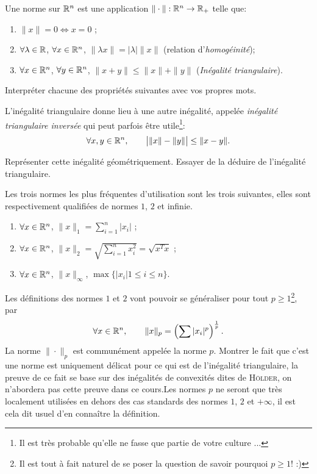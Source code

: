 \documentclass[11pt, a4paper]{article}
\begin{document}
\begin{defn}
  Une norme sur $\mathbb{R}^n$ est une application $\|\cdot\| : \mathbb{R}^n \to \mathbb{R}_+$
  telle que:
  \begin{enumerate}
  \item $\|x\| = 0 \Leftrightarrow x = 0$ ;
  \item $\forall \lambda \in \mathbb{R}$, $\forall x \in \mathbb{R}^n$,
    $\|\lambda x\| = |\lambda|\|x\|$ (relation d'\textit{homogéinité});
  \item $\forall x \in \mathbb{R}^n$, $\forall y \in \mathbb{R}^n$,
    $\|x + y\| \leq \|x\| + \|y\|$ (\textit{Inégalité triangulaire}).
  \end{enumerate}
\end{defn}
\begin{question}
  Interpréter chacune des propriétés suivantes avec vos propres mots.
\end{question}
L'inégalité triangulaire donne lieu à une autre inégalité, appelée
\textit{inégalité triangulaire inversée} qui peut parfois être
utile\footnote{Il est très probable qu'elle ne fasse que partie de
  votre culture ...}:
\[
  \forall x, y \in \mathbb{R}^n, \qquad \big| \|x\| -\|y\| \big| \leq \|x -
  y\|.
\]
\begin{question}
  Représenter cette inégalité géométriquement. Essayer de la déduire
  de l'inégalité triangulaire.
\end{question}
Les trois normes les plus fréquentes d'utilisation sont les trois
suivantes, elles sont respectivement qualifiées de normes $1$, $2$ et
infinie.
\begin{enumerate}
\item $\forall x \in \mathbb{R}^n$, $\| x \|_1 = \sum_{i=1}^n |x_i|$ ;
\item $\forall x \in \mathbb{R}^n$,
  $\| x \|_2 = \sqrt{\sum_{i=1}^n x_i^2} = \sqrt{x^Tx}$ ;
\item $\forall x \in \mathbb{R}^n$, $\|x \|_{\infty}$,
  $\max\{|x_i| 1 \leq i \leq n\}$.
\end{enumerate}
Les définitions des normes $1$ et $2$ vont pouvoir se généraliser pour
tout $p \geq 1$\footnote{Il est tout à fait naturel de se poser la
  question de savoir pourquoi $p \geq 1$! :)}, par
\[
  \forall x \in \mathbb{R}^n, \qquad \|x \|_p = \left(\sum |x_i|^p
  \right)^{\frac{1}{p}}.
\]
La norme $\|\cdot\|_p$ est communément appelée la norme $p$. Montrer
le fait que c'est une norme est uniquement délicat pour ce qui est de
l'inégalité triangulaire, la preuve de ce fait se base sur des
inégalités de convexités dites de \textsc{Hölder}, on n'abordera pas
cette preuve dans ce cours.Les normes $p$ ne seront que très
localement utilisées en dehors des cas standards des normes $1$, $2$
et $+\infty$, il est cela dit usuel d'en connaître la définition.
\end{document}
